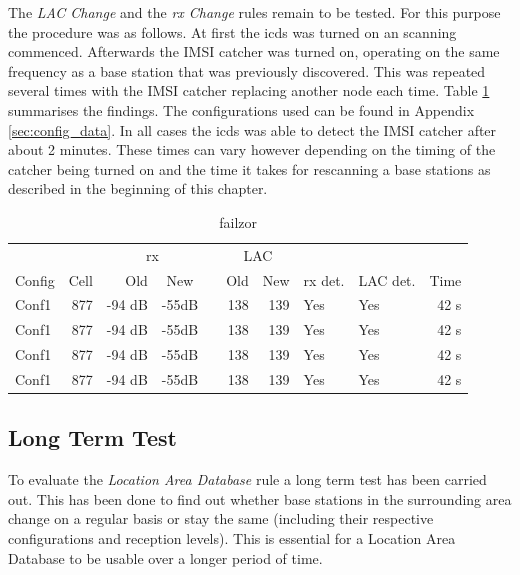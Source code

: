 The \emph{LAC Change} and the \emph{rx Change} rules remain to be tested.
For this purpose the procedure was as follows.
At first the \gls{icds} was turned on an scanning commenced.
Afterwards the IMSI catcher was turned on, operating on the same frequency as a base station that was previously discovered.
This was repeated several times with the IMSI catcher replacing another node each time.
Table \ref{tab:par_change} summarises the findings.
The configurations used can be found in Appendix \ref{sec:config_data}.
In all cases the \gls{icds} was able to detect the IMSI catcher after about 2 minutes.
These times can vary however depending on the timing of the catcher being turned on and the time it takes for rescanning a base stations as described in the beginning of this chapter.
\begin{table}
\centering
\begin{tabular}{lrrcrrrllr}
\toprule
		&				&\multicolumn{2}{c}{rx}		&\phantom{a}	&\multicolumn{2}{c}{LAC}	&				&	&		\\
							\cmidrule{3-4} 								\cmidrule{6-7} 
Config 	&Cell	&Old	&New				&				&Old	&New				&rx det.	&LAC det.		&Time\\
\midrule
Conf1	&877			&-94 dB	&-55dB				&				&138	&139				&Yes		&Yes	&42 s\\
Conf1	&877			&-94 dB	&-55dB				&				&138	&139				&Yes		&Yes	&42 s\\
Conf1	&877			&-94 dB	&-55dB				&				&138	&139				&Yes		&Yes	&42 s\\
Conf1	&877			&-94 dB	&-55dB				&				&138	&139				&Yes		&Yes	&42 s\\
\bottomrule
\end{tabular}
\caption{failzor}
\label{tab:par_change}
\end{table}

\subsection{Long Term Test}
To evaluate the \emph{Location Area Database} rule a long term test has been carried out.
This has been done to find out whether base stations in the surrounding area change on a regular basis or stay the same (including their respective configurations and reception levels).
This is essential for a Location Area Database to be usable over a longer period of time.

